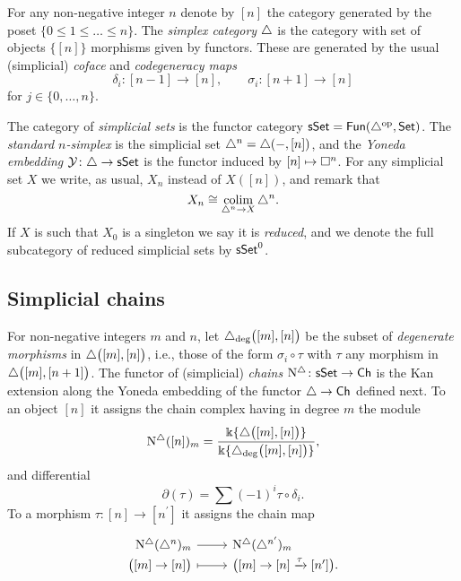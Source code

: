 For any non-negative integer $n$ denote by $[n]$ the category generated by the poset $\{0 \leq 1 \leq \dots \leq n\}$.
The \textit{simplex category} $\triangle$ is the category with set of objects $\big\{ [n] \big\}$ morphisms given by functors.
These are generated by the usual (simplicial) \textit{coface} and \textit{codegeneracy maps}
\begin{equation*}
\delta_i \colon [n-1] \to [n], \qquad \sigma_i \colon [n+1] \to [n]
\end{equation*}
for $j \in \{0, \dots, n\}$.

The category of \textit{simplicial sets} is the functor category $\mathsf{sSet} = \mathsf{Fun}(\triangle^{\mathrm{op}}, \mathsf{Set})$.
The \textit{standard $n$-simplex} is the simplicial set $\triangle^n = \triangle(-, [n])$, and the \textit{Yoneda embedding} $\operatorname{\mathcal{Y}} \colon \triangle \to \mathsf{sSet}$ is the functor induced by $[n] \mapsto \square^n$.
For any simplicial set $X$ we write, as usual, $X_n$ instead of $X([n])$, and remark that
\begin{equation*}
X_n \cong \operatorname*{colim}_{\triangle^n \to X} \triangle^n.
\end{equation*}
If $X$ is such that $X_0$ is a singleton we say it is \textit{reduced}, and we denote the full subcategory of reduced simplicial sets by $\mathsf{sSet}^0$.

\subsection{Simplicial chains}

For non-negative integers $m$ and $n$, let $\triangle_{\deg} \big( [m], [n] \big)$ be the subset of \textit{degenerate morphisms} in $\triangle \big( [m], [n] \big)$, i.e., those of the form $\sigma_i \circ \tau$ with $\tau$ any morphism in $\triangle \big( [m], [n+1] \big)$.
The functor of (simplicial) \textit{chains} $\operatorname{N^{\triangle}} \colon \mathsf{sSet} \to \mathsf{Ch}$ is the Kan extension along the Yoneda embedding of the functor $\triangle \to \mathsf{Ch}$ defined next.
To an object $[n]$ it assigns the chain complex having in degree $m$ the module
\begin{equation*}
\operatorname{N^{\triangle}}([n])_m = \frac{\Bbbk\{\triangle \big( [m], [n] \big) \}}{\Bbbk\{\triangle_{\deg} \big( [m], [n] \big) \}},
\end{equation*}
and differential
\begin{equation*}
\partial(\tau) = \sum (-1)^i \tau \circ \delta_i.
\end{equation*}
To a morphism $\tau \colon [n] \to [n^\prime]$ it assigns the chain map
\begin{equation*}
\begin{tikzcd}[row sep=-3pt, column sep=normal,
/tikz/column 1/.append style={anchor=base east},
/tikz/column 2/.append style={anchor=base west}]
\schains(\simplex^n)_m \arrow[r] &  \schains(\simplex^{n^\prime})_m \\
\big( [m] \to [n] \big) \arrow[r, mapsto] & \big( [m] \to [n] \xra{\tau} [n^\prime] \big).
\end{tikzcd}
\end{equation*}

